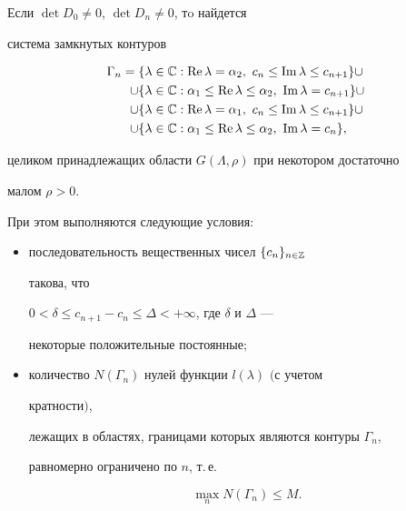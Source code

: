 \begin{lem} 


Если $\det D_0\ne0$, $\det D_n\ne0$, тo найдется 


система замкнутых контуров 


\begin{align*} 


\Gamma_n=\{\lambda &\in\Bbb C:\re\lambda=\alpha_2,\ c_n\le 


\im\lambda\le c_{n+1}\}\cup \\ 


% 


\cup\{\lambda &\in\Bbb C:\alpha_1\le \re\lambda\le\alpha_2,\ \im 


\lambda=c_{n+1}\}\cup \\ 


% 


\cup\{\lambda &\in\Bbb C:\re\lambda=\alpha_1,\ c_n\le 


\im\lambda\le c_{n+1}\}\cup \\


% 


\cup\{\lambda &\in\Bbb C:\alpha_1\le\re\lambda\le\alpha_2,\ \im 


\lambda=c_n\}, 


\end{align*} 


целиком принадлежащих области $G(\Lambda,\rho)$ при некотором достаточно 


малом $\rho>0$. 


При этом выполняются следующие условия\/$:$ 


\begin{itemize} 


\item[(i)] последовательность вещественных чисел $\{c_n\}_{n\in\Bbb Z}$ 


такова, что 


$0<\delta\le c_{n+1}-c_n\le\Delta<+\infty$, где $\delta$ и $\Delta$ --- 


некоторые положительные постоянные\/$;$ 


\item[(ii)] количество $N(\Gamma_n)$ нулей функции $l(\lambda)$ $($с учетом 


кратности$)$, 


лежащих в областях, границами которых являются контуры $\Gamma_n$, 


равномерно ограничено по $n$, т.\,е. 


$$ 


\max_n N(\Gamma_n)\le M. 


$$ 


\end{itemize} 


\end{lem} 


